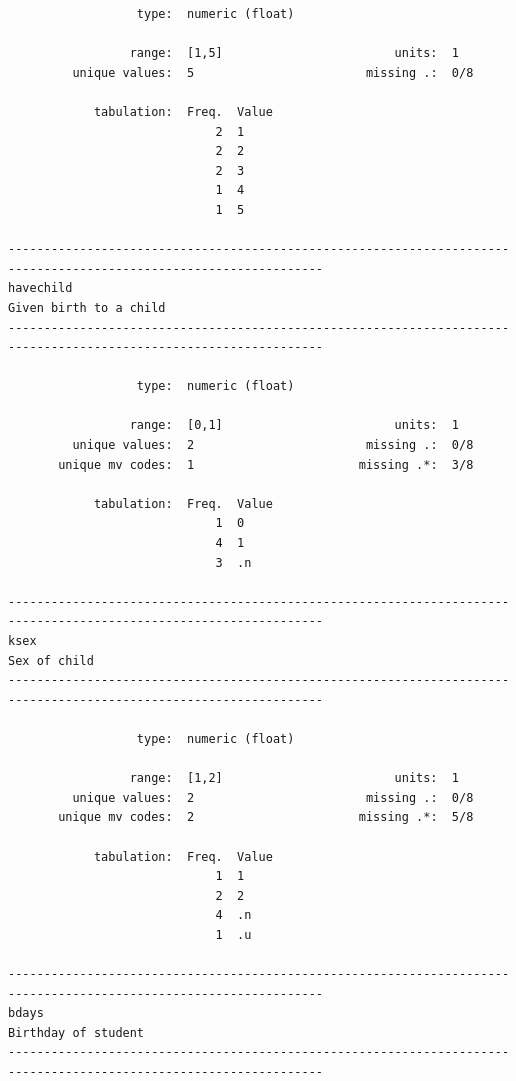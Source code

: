 \documentclass[
]{book}
\begin{document}
\begin{verbatim}
                  type:  numeric (float)

                 range:  [1,5]                        units:  1
         unique values:  5                        missing .:  0/8

            tabulation:  Freq.  Value
                             2  1
                             2  2
                             2  3
                             1  4
                             1  5

------------------------------------------------------------------------------------------------------------------
havechild                                                                                   Given birth to a child
------------------------------------------------------------------------------------------------------------------

                  type:  numeric (float)

                 range:  [0,1]                        units:  1
         unique values:  2                        missing .:  0/8
       unique mv codes:  1                       missing .*:  3/8

            tabulation:  Freq.  Value
                             1  0
                             4  1
                             3  .n

------------------------------------------------------------------------------------------------------------------
ksex                                                                                                  Sex of child
------------------------------------------------------------------------------------------------------------------

                  type:  numeric (float)

                 range:  [1,2]                        units:  1
         unique values:  2                        missing .:  0/8
       unique mv codes:  2                       missing .*:  5/8

            tabulation:  Freq.  Value
                             1  1
                             2  2
                             4  .n
                             1  .u

------------------------------------------------------------------------------------------------------------------
bdays                                                                                          Birthday of student
------------------------------------------------------------------------------------------------------------------


\end{verbatim}
\end{document}
